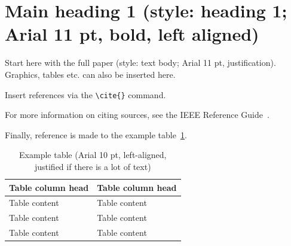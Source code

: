 \documentclass{article}
\begin{document}
\newcommand{\papertitel}{Title (style: title; Arial 14 pt, bold, left aligned)}

\newcommand{\speaker}{Academic Title, first name, last name, company, country of speaker}

\newcommand{\coautors}{Academic Title, first name, last name, company, country of co-author\\
	Other co-authors below with the same information, each in a new line\\
	(style: authors; Arial 11 pt, left-aligned)}

\newcommand{\keywords}{Mode-stirred chamber, Reverberation chamber, Statistical distribution, Correlation, Transmission line theory, Immunity test, Electromagnetic compatibility, Directivity, Absorber chamber, Waveguide, DUT model}



\section{Main heading 1 (style: heading 1; Arial 11 pt, bold, left aligned)}

Start here with the full paper (style: text body; Arial 11 pt, justification). Graphics, tables etc. can also be inserted here.

Insert references via the \verb|\cite{}| command.

\nocite{source1,source2,source3,source4,source5}

For more information on citing sources, see the IEEE Reference Guide~\cite{ieee:style_manual}.

Finally, reference is made to the example table~\ref{tab:example}.

\begin{table}
	\centering
		\begin{tabular}{@{}p{}p{}@{}}
			\toprule
			\bfseries Table column head & \bfseries Table column head \\
			\midrule
			Table content & Table content \\
			\midrule
			Table content & Table content \\
			\midrule
			Table content & Table content \\
			\bottomrule
	\end{tabular}
	\caption{Example table (Arial 10 pt, left-aligned, justified if there is a lot of text)}
	\label{tab:example}
\end{table}
\end{document}
